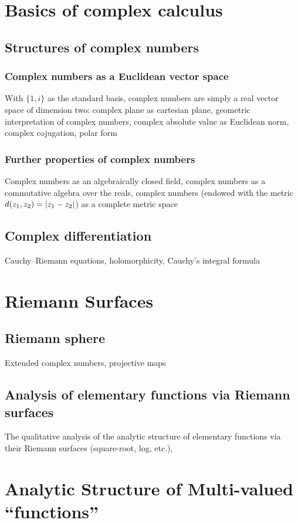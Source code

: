 \chapter{Basics of complex calculus}
\section{Structures of complex numbers}
\subsection{Complex numbers as a Euclidean vector space}
With $\{1,i\}$ as the standard basis, complex numbers are simply a real vector space of dimension two: complex plane as cartesian plane, geometric interpretation of complex numbers, complex absolute value as Euclidean norm, complex cojugation, polar form
\subsection{Further properties of complex numbers}
Complex numbers as an algebraically closed field, complex numbers as a commutative algebra over the reals, complex numbers (endowed with the metric $d(z_1,z_2)=\abs{z_1-z_2}$) as a complete metric space
\section{Complex differentiation}
Cauchy–Riemann equations, holomorphicity, Cauchy's integral formula

\chapter{Riemann Surfaces}
\section{Riemann sphere}
Extended complex numbers, projective maps
\section{Analysis of elementary functions via Riemann surfaces}
The qualitative analysis of the analytic structure of elementary functions via their Riemann surfaces (square-root, log, etc.),  

\chapter{Analytic Structure of Multi-valued ``functions''}
